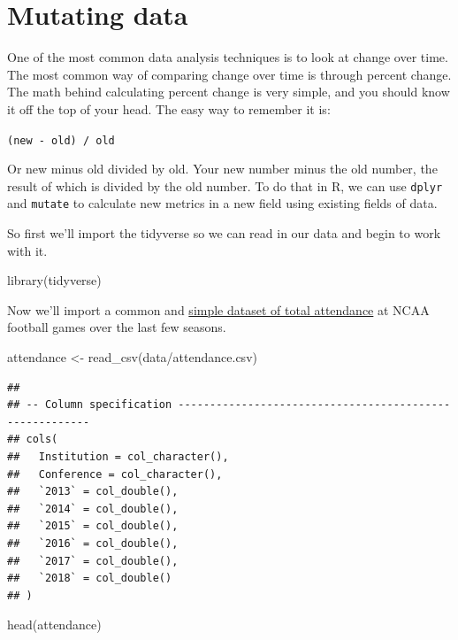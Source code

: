 \documentclass[
]{book}
\newenvironment{Shaded}{\begin{snugshade}}{\end{snugshade}}
\newcommand{\FunctionTok}[1]{\textcolor[rgb]{0.00,0.00,0.00}{#1}}
\newcommand{\NormalTok}[1]{#1}
\newcommand{\OtherTok}[1]{\textcolor[rgb]{0.56,0.35,0.01}{#1}}
\newcommand{\StringTok}[1]{\textcolor[rgb]{0.31,0.60,0.02}{#1}}
\begin{document}
\hypertarget{mutating-data}{%
\chapter{Mutating data}\label{mutating-data}}

One of the most common data analysis techniques is to look at change over time. The most common way of comparing change over time is through percent change. The math behind calculating percent change is very simple, and you should know it off the top of your head. The easy way to remember it is:

\texttt{(new\ -\ old)\ /\ old}

Or new minus old divided by old. Your new number minus the old number, the result of which is divided by the old number. To do that in R, we can use \texttt{dplyr} and \texttt{mutate} to calculate new metrics in a new field using existing fields of data.

So first we'll import the tidyverse so we can read in our data and begin to work with it.

\begin{Shaded}
\begin{Highlighting}[]
\FunctionTok{library}\NormalTok{(tidyverse)}
\end{Highlighting}
\end{Shaded}

Now we'll import a common and \href{https://unl.box.com/s/oajabnn5614s22jstgcd9ojxo2njn6jt}{simple dataset of total attendance} at NCAA football games over the last few seasons.

\begin{Shaded}
\begin{Highlighting}[]
\NormalTok{attendance }\OtherTok{\textless{}{-}} \FunctionTok{read\_csv}\NormalTok{(}\StringTok{\textquotesingle{}data/attendance.csv\textquotesingle{}}\NormalTok{)}
\end{Highlighting}
\end{Shaded}

\begin{verbatim}
## 
## -- Column specification --------------------------------------------------------
## cols(
##   Institution = col_character(),
##   Conference = col_character(),
##   `2013` = col_double(),
##   `2014` = col_double(),
##   `2015` = col_double(),
##   `2016` = col_double(),
##   `2017` = col_double(),
##   `2018` = col_double()
## )
\end{verbatim}

\begin{Shaded}
\begin{Highlighting}[]
\FunctionTok{head}\NormalTok{(attendance)}
\end{Highlighting}
\end{Shaded}
\end{document}
